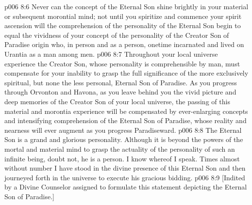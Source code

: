 \vs p006 8:6 Never can the concept of the Eternal Son shine brightly in your material or subsequent morontial mind; not until you spiritize and commence your spirit ascension will the comprehension of the personality of the Eternal Son begin to equal the vividness of your concept of the personality of the Creator Son of Paradise origin who, in person and as a person, onetime incarnated and lived on Urantia as a man among men.
\vs p006 8:7 Throughout your local universe experience the Creator Son, whose personality is comprehensible by man, must compensate for your inability to grasp the full significance of the more exclusively spiritual, but none the less personal, Eternal Son of Paradise. As you progress through Orvonton and Havona, as you leave behind you the vivid picture and deep memories of the Creator Son of your local universe, the passing of this material and morontia experience will be compensated by ever\hyp{}enlarging concepts and intensifying comprehension of the Eternal Son of Paradise, whose reality and nearness will ever augment as you progress Paradiseward.
\vs p006 8:8 \pc The Eternal Son is a grand and glorious personality. Although it is beyond the powers of the mortal and material mind to grasp the actuality of the personality of such an infinite being, doubt not, he is a person. I know whereof I speak. Times almost without number I have stood in the divine presence of this Eternal Son and then journeyed forth in the universe to execute his gracious bidding.
\vsetoff
\vs p006 8:9 [Indited by a Divine Counselor assigned to formulate this statement depicting the Eternal Son of Paradise.]
